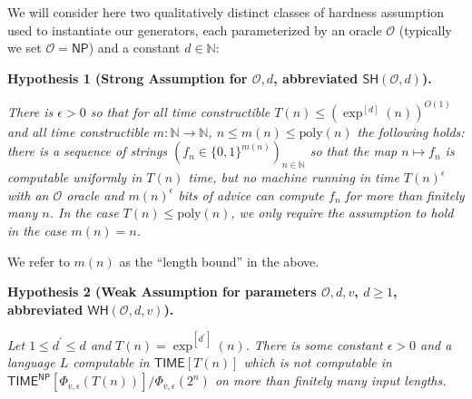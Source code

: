 \documentclass[10pt,a4paper]{article}
\begin{document}
We will consider here two qualitatively distinct classes of hardness assumption used to instantiate our generators, each parameterized by an oracle $\mathcal{O}$ (typically we set $\mathcal{O}={\mathsf{NP}}$) and a constant $d\in\mathbb{N}$:\par





\par\medskip\noindent\textbf{
\textbf{Hypothesis 1}\textbf{ }(Strong Assumption for $\mathcal{O},d$, abbreviated $\mathsf{SH}(\mathcal{O},d)$)\textbf{.}
}\par



\emph{There is $\epsilon>0$ so that for all time constructible $T(n)\leq(\exp^{[d]}(n))^{O(1)}$ and all time constructible $m:\mathbb{N}\to\mathbb{N}$, $n\leq m(n)\leq\mathrm{poly}(n)$ the following holds: there is a sequence of strings $(f_{n}\in\{0,1\}^{m(n)})_{n\in\mathbb{N}}$ so that the map $n\mapsto f_{n}$ is computable uniformly in $T(n)$ time, but no machine running in time $T(n)^{\epsilon}$ with an $\mathcal{O}$ oracle and $m(n)^{\epsilon}$ bits of advice can compute $f_{n}$ for more than finitely many $n$. In the case $T(n)\leq\mathrm{poly}(n)$, we only require the assumption to hold in the case $m(n)=n$.}\par






We refer to $m(n)$ as the “length bound” in the above.\par





\par\medskip\noindent\textbf{
\textbf{Hypothesis 2}\textbf{ }(Weak Assumption for parameters $\mathcal{O},d,v$, $d\geq 1$, abbreviated $\mathsf{WH}(\mathcal{O},d,v)$)\textbf{.}
}\par



\emph{Let $1\leq d^{\prime}\leq d$ and $T(n)=\exp^{[d^{\prime}]}(n)$. There is some constant $\epsilon>0$ and a language $L$ computable in ${\mathsf{TIME}}[T(n)]$ which is not computable in ${\mathsf{TIME}}^{\mathsf{NP}}[\Phi_{v,\epsilon}(T(n))]/\Phi_{v,\epsilon}(2^{n})$ on more than finitely many input lengths.}\par
\end{document}
